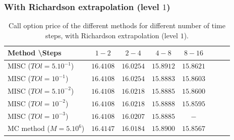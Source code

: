 \documentclass[11pt]{article}
\begin{document}
\FloatBarrier

\subsubsection*{With Richardson extrapolation (level $1$)}

\begin{table}[h!]
	\centering
	\begin{tabular}{l*{6}{c}r}
		Method \textbackslash  Steps            & $1-2$ & $2-4$ & $4-8$ & $8-16$ &   \\
		\hline
		MISC ($TOl=5.10^{-1}$)  & $16.4108$ & $16.0254$ & $15.8912$ & $15.8621$  \\
		MISC ($TOl=10^{-1}$)  & $16.4108$ & $16.0254$ & $15.8883$ & $15.8603$  \\
		MISC ($TOl=5.10^{-2}$) & $16.4108$ & $16.0218$ & $15.8885$ & $15.8600$  \\
		MISC ($TOl=10^{-2}$) & $16.4108$& $16.0218$ & $15.8888$ & $15.8595$  \\
		MISC ($TOl=10^{-3}$) & $16.4108$ & $16.0207$ & $15.8885$ & $-$  \\
		
		\hline
		MC method ($M=5.10^{6}$)   & $  16.4147$ & $ 16.0184$ & $15.8900$ & $15.8567$  \\
		\hline
	\end{tabular}
	\caption{Call option price of the different methods for different number of time steps, with Richardson extrapolation (level $1$).}
	\label{table: Call option price of the different methods for different number of time steps, with Richardson extrapolation (level1).}
\end{table}
\end{document}
